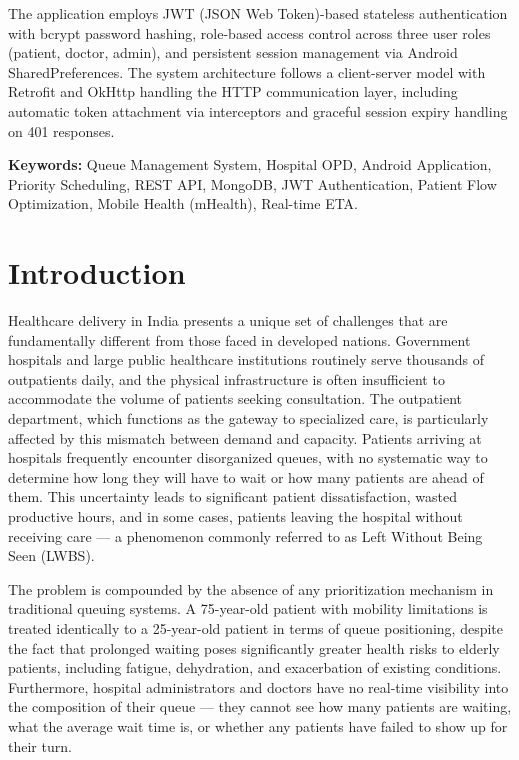 \documentclass[12pt,a4paper]{article}
\begin{document}
The application employs JWT (JSON Web Token)-based stateless authentication with bcrypt password hashing, role-based access control across three user roles (patient, doctor, admin), and persistent session management via Android SharedPreferences. The system architecture follows a client-server model with Retrofit and OkHttp handling the HTTP communication layer, including automatic token attachment via interceptors and graceful session expiry handling on 401 responses.

\vspace{0.5em}
\noindent\textbf{Keywords:} Queue Management System, Hospital OPD, Android Application, Priority Scheduling, REST API, MongoDB, JWT Authentication, Patient Flow Optimization, Mobile Health (mHealth), Real-time ETA.

\newpage

\section{Introduction}

Healthcare delivery in India presents a unique set of challenges that are fundamentally different from those faced in developed nations. Government hospitals and large public healthcare institutions routinely serve thousands of outpatients daily, and the physical infrastructure is often insufficient to accommodate the volume of patients seeking consultation. The outpatient department, which functions as the gateway to specialized care, is particularly affected by this mismatch between demand and capacity. Patients arriving at hospitals frequently encounter disorganized queues, with no systematic way to determine how long they will have to wait or how many patients are ahead of them. This uncertainty leads to significant patient dissatisfaction, wasted productive hours, and in some cases, patients leaving the hospital without receiving care --- a phenomenon commonly referred to as Left Without Being Seen (LWBS).

The problem is compounded by the absence of any prioritization mechanism in traditional queuing systems. A 75-year-old patient with mobility limitations is treated identically to a 25-year-old patient in terms of queue positioning, despite the fact that prolonged waiting poses significantly greater health risks to elderly patients, including fatigue, dehydration, and exacerbation of existing conditions. Furthermore, hospital administrators and doctors have no real-time visibility into the composition of their queue --- they cannot see how many patients are waiting, what the average wait time is, or whether any patients have failed to show up for their turn.
\end{document}
